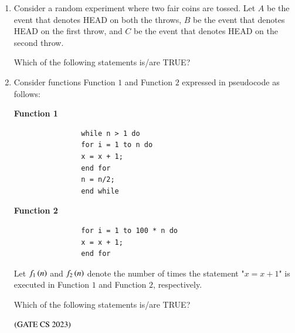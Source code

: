 \documentclass[journal,12pt,onecolumn]{IEEEtran}
\theoremstyle{remark}
\begin{document}
\begin{enumerate}
		\item Consider a random experiment where two fair coins are tossed. Let $A$ be the event that denotes HEAD on both the throws, $B$ be the event that denotes HEAD on the first throw, and $C$ be the event that denotes HEAD on the second throw.
		
		Which of the following statements is/are TRUE?
		
		\hfill{}
		
		\begin{enumerate}
		\end{enumerate}
		
		\item Consider functions Function $1$ and Function $2$ expressed in pseudocode as follows:
		
		\begin{minipage}{0.45\textwidth}
			\textbf{Function 1}
			\begin{verbatim}
				while n > 1 do
				for i = 1 to n do
				x = x + 1;
				end for
				n = n/2;
				end while
			\end{verbatim}
		\end{minipage}
		\hfill
		\vrule
		\hfill
		\begin{minipage}{0.45\textwidth}
			\textbf{Function 2}
			\begin{verbatim}
				for i = 1 to 100 * n do
				x = x + 1;
				end for
			\end{verbatim}
		\end{minipage}
		
		Let $f_1\left(n\right)$ and $f_2\left(n\right)$ denote the number of times the statement "$x = x + 1$" is executed in Function $1$ and Function $2$, respectively.
		
		Which of the following statements is/are TRUE?
		
		\hfill $\left(\text{GATE CS 2023}\right)$
		
		\begin{enumerate}
			\begin{multicols}{2}
				\item $f_1\brak{n} \in \Theta\brak{f_2\brak{n}}$
				\item $f_1\brak{n} \in o\brak{f_2\brak{n}}$
				\item $f_1\brak{n} \in \omega\brak{f_2\brak{n}}$
				\item $f_1\brak{n} \in O\brak{n}$
			\end{multicols}
		\end{enumerate}
		

\end{enumerate}
\end{document}

